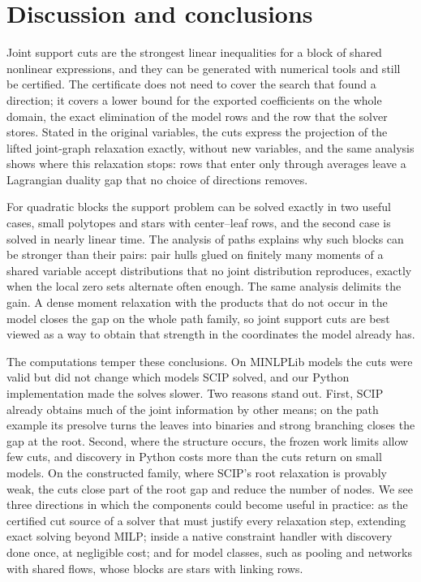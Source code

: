 \section{Discussion and conclusions}\label{sec:conclusions}

Joint support cuts are the strongest linear inequalities for a block of
shared nonlinear expressions, and they can be generated with numerical
tools and still be certified. The certificate does not need to cover the
search that found a direction; it covers a lower bound for the exported
coefficients on the whole domain, the exact elimination of the model rows
and the row that the solver stores. Stated in the original variables, the
cuts express the projection of the lifted joint-graph relaxation exactly,
without new variables, and the same analysis shows where this relaxation
stops: rows that enter only through averages leave a Lagrangian duality
gap that no choice of directions removes.

For quadratic blocks the support problem can be solved exactly in two
useful cases, small polytopes and stars with center--leaf rows, and the
second case is solved in nearly linear time. The analysis of paths
explains why such blocks can be stronger than their pairs: pair hulls
glued on finitely many moments of a shared variable accept distributions
that no joint distribution reproduces, exactly when the local zero sets
alternate often enough. The same analysis delimits the gain. A dense
moment relaxation with the products that do not occur in the model closes
the gap on the whole path family, so joint support cuts are best viewed
as a way to obtain that strength in the coordinates the model already has.

The computations temper these conclusions. On MINLPLib models the cuts
were valid but did not change which models SCIP solved, and our Python
implementation made the solves slower. Two reasons stand out. First, SCIP
already obtains much of the joint information by other means; on the path
example its presolve turns the leaves into binaries and strong branching
closes the gap at the root. Second, where the structure occurs, the
frozen work limits allow few cuts, and discovery in Python costs more than
the cuts return on small models. On the constructed family, where SCIP's
root relaxation is provably weak, the cuts close part of the root gap and
reduce the number of nodes. We see three directions in which the
components could become useful in practice: as the certified cut source
of a solver that must justify every relaxation step, extending exact
solving beyond MILP; inside a native constraint handler with discovery
done once, at negligible cost; and for model classes, such as pooling and
networks with shared flows, whose blocks are stars with linking rows.

